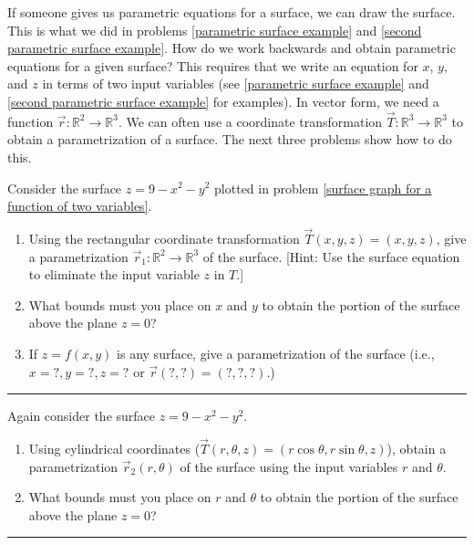 If someone gives us parametric equations for a surface, we can draw the surface. This is what we did in problems \ref{parametric surface example} and \ref{second parametric surface example}. 
How do we work backwards and obtain parametric equations for a given surface?
This requires that we write an equation for $x$, $y$, and $z$ in terms of two input variables (see \ref{parametric surface example} and \ref{second parametric surface example} for examples). 
In vector form, we need a function $\vec r:\mathbb{R}^2\to\mathbb{R}^3$. 
We can often use a coordinate transformation $\vec T:\mathbb{R}^3\to\mathbb{R}^3$ to obtain a parametrization of a surface. 
The next three problems show how to do this.   
\begin{problem}%
%
 Consider the surface $z=9-x^2-y^2$ plotted in problem \ref{surface graph for a function of two variables}.
\begin{enumerate}
 \item {}%
Using the rectangular coordinate transformation $\vec T(x,y,z)=(x,y,z)$, give a parametrization $\vec r_1:\mathbb{R}^2\to\mathbb{R}^3$ of the surface.  
[Hint: Use the surface equation to eliminate the input variable $z$ in $T$.]
 \item What bounds must you place on $x$ and $y$ to obtain the portion of the surface above the plane $z=0$?
 \item If $z=f(x,y)$ is any surface, give a parametrization of the surface (i.e., $x=?, y=?, z=?$ or $\vec r (?,?)=(?,?,?)$.)
\end{enumerate}

\hrule\end{problem}
\begin{problem}%
%
 Again consider the surface $z=9-x^2-y^2$.
\begin{enumerate}
 \item {}%
Using cylindrical coordinates ($\vec T(r,\theta,z) = (r\cos \theta, r\sin\theta, z)$), obtain a parametrization $\vec r_2(r,\theta)$ of the surface using the input variables $r$ and $\theta$.  
 \item What bounds must you place on $r$ and $\theta$ to obtain the portion of the surface above the plane $z=0$?
\end{enumerate}

\hrule\end{problem}


